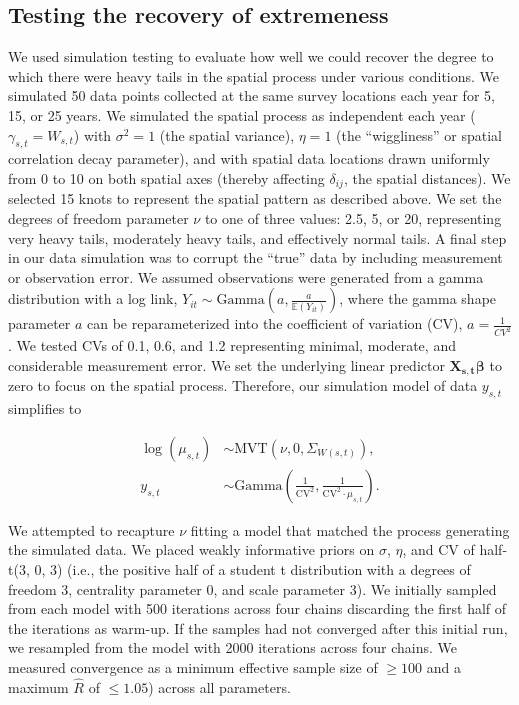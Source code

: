 \documentclass[12pt,english]{article}
\begin{document}
\begin{spacing}{1.5}

\subsection{Testing the recovery of extremeness}

We used simulation testing to evaluate how well we could recover the degree to
which there were heavy tails in the spatial process under various conditions.
We simulated 50 data points collected at the same survey locations each year
for 5, 15, or 25 years. We simulated the spatial process as independent each
year ($\gamma_{s,t} = W_{s,t}$) with $\sigma^2 = 1$ (the spatial variance),
$\eta = 1$ (the ``wiggliness'' or spatial correlation decay parameter), and
with spatial data locations drawn uniformly from 0 to 10 on both spatial axes
(thereby affecting $\delta_{ij}$, the spatial distances).
We selected 15 knots to represent the spatial pattern as described above.
We set the degrees of freedom parameter $\nu$ to
one of three values: 2.5, 5, or 20, representing very heavy tails, moderately heavy
tails, and effectively normal tails. A final step in our data
simulation was to corrupt the ``true'' data by including measurement or
observation error. We assumed observations were generated from a gamma
distribution with a log link, $Y_{it}\sim \mathrm{Gamma}\left(a,\frac
  {a}{\mathbb{E}(Y_{it})} \right)$, where the gamma shape parameter $a$ can be
reparameterized into the coefficient of variation (CV), $a=\frac{1}{CV^2}$. We
tested CVs of 0.1, 0.6, and 1.2 representing minimal, moderate, and
considerable measurement error. We set the underlying linear predictor
$\bm{X_{s,t}} \bm{\beta}$ to zero to focus on the spatial process. Therefore,
our simulation model of data $y_{s,t}$ simplifies to

\begin{align}
  \log(\mu_{s,t}) &\sim \mathrm{MVT}\left(\nu, 0, \Sigma_{W(s,t)}\right),\\
  y_{s,t} &\sim \mathrm{Gamma} \left( \frac{1}{\mathrm{CV}^2},
  \frac{1}{\mathrm{CV}^2 \cdot \mu_{s,t} } \right).
\end{align}

We attempted to recapture $\nu$ fitting a model that matched the process
generating the simulated data. We placed weakly informative priors on $\sigma$,
$\eta$, and CV of half-t(3, 0, 3) (i.e., the positive half of a student t
distribution with a degrees of freedom 3, centrality parameter 0, and scale
parameter 3). We initially sampled from each model with 500 iterations across
four chains discarding the first half of the iterations as warm-up. If the
samples had not converged after this initial run, we resampled from the model
with 2000 iterations across four chains. We measured convergence as a minimum
effective sample size of $\ge 100$ and a maximum $\hat{R}$ of $\le 1.05$)
across all parameters.


\end{spacing}
\end{document}
